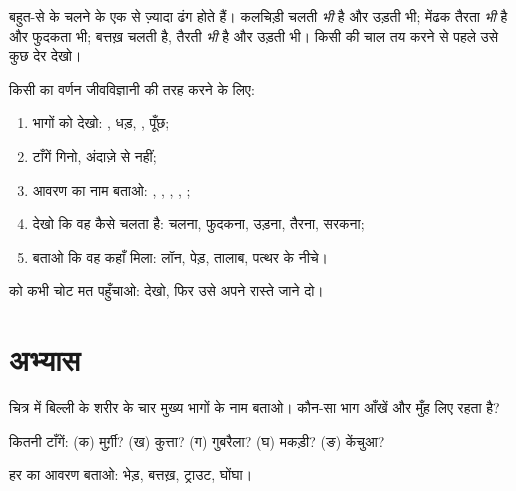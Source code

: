 \begin{remark}[एक जंतु, कई ढंग]\label{rem:g1:animals-around-us:several}
बहुत-से  के चलने के एक से ज़्यादा ढंग होते हैं। कलचिड़ी चलती
\emph{भी} है और उड़ती भी; मेंढक तैरता \emph{भी} है और फुदकता भी;
बत्तख़ चलती है, तैरती \emph{भी} है और उड़ती भी। किसी  की चाल तय
करने से पहले उसे कुछ देर देखो।
\end{remark}

\begin{method}[जंतु का प्रेक्षण]\label{met:g1:animals-around-us:observe}
किसी  का वर्णन जीवविज्ञानी की तरह करने के लिए:
\begin{enumerate}
  \item भागों को देखो: , धड़, , पूँछ;
  \item टाँगें गिनो, अंदाज़े से नहीं;
  \item आवरण का नाम बताओ: , , , , ;
  \item देखो कि वह कैसे चलता है: चलना, फुदकना, उड़ना, तैरना, सरकना;
  \item बताओ कि वह कहाँ मिला: लॉन, पेड़, तालाब, पत्थर के नीचे।
\end{enumerate}
 को कभी चोट मत पहुँचाओ: देखो, फिर उसे अपने रास्ते जाने दो।
\end{method}

\section{अभ्यास}

\begin{exercise}[$\star$]\label{exo:g1:animals-around-us:1}
चित्र में बिल्ली के शरीर के चार मुख्य भागों के नाम बताओ। कौन-सा भाग
आँखें और मुँह लिए रहता है?
\end{exercise}

\begin{exercise}[$\star$]\label{exo:g1:animals-around-us:2}
कितनी टाँगें: (क) मुर्ग़ी? (ख) कुत्ता? (ग) गुबरैला? (घ) मकड़ी?
(ङ) केंचुआ?
\end{exercise}

\begin{exercise}[$\star$]\label{exo:g1:animals-around-us:3}
हर  का आवरण बताओ: भेड़, बत्तख़, ट्राउट, घोंघा।
\end{exercise}

